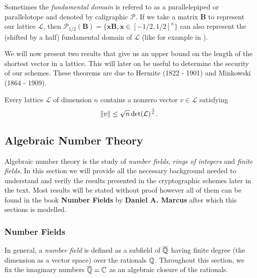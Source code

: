 \begin{remark}
    Sometimes the \textit{fundamental domain} is refered to as a parallelepiped or parallelotope and denoted by caligraphic $\mathcal{P}$. If we take a matrix $\bm{B}$ to represent our lattice $\mathcal{L}$, then $\mathcal{P}_{1/2}(\bm{B}) = \{\bm{x}\bm{B}, \bm{x} \in [-1/2, 1/2]^n \}$ can also represent the (shifted by a half) fundamental domain of $\mathcal{L}$ (like for example in \cite{gentry}).
\end{remark}

We will now present two results that give us an upper bound on the length of the shortest vector in a lattice. This will later on be useful to determine the security of our schemes. These theorems are due to Hermite (1822 - 1901) and Minkowski (1864 - 1909).

\begin{theorem}
    Every lattice $\mathcal{L}$ of dimension $n$ contains a nonzero vector $v \in \mathcal{L}$ satisfying
    $$ \norm{v} \leq \sqrt{n} \det(\mathcal{L})^{\frac{1}{n}}.$$
\end{theorem}

\begin{remark}
    
\end{remark}

\subsection{Algebraic Number Theory}

Algebraic number theory is the study of \textit{number fields}, \textit{rings of integers} and \textit{finite fields}. In this section we will provide all the necessary background needed to understand and verify the results presented in the cryptographic schemes later in the text. Most results will be stated without proof however all of them can be found in the book \textbf{Number Fields} by \textbf{Daniel A. Marcus} \cite{algebra} after which this sections is modelled.

\subsubsection*{Number Fields}
In general, a \textit{number field} is defined as a subfield of $\overline{\mathbb{Q}}$ having finite degree (the dimension as a vector space) over the rationals $\mathbb{Q}$. Throughout this section, we fix the imaginary numbers $\overline{\mathbb{Q}} = \mathbb{C}$ as an algebraic closure of the rationals.

